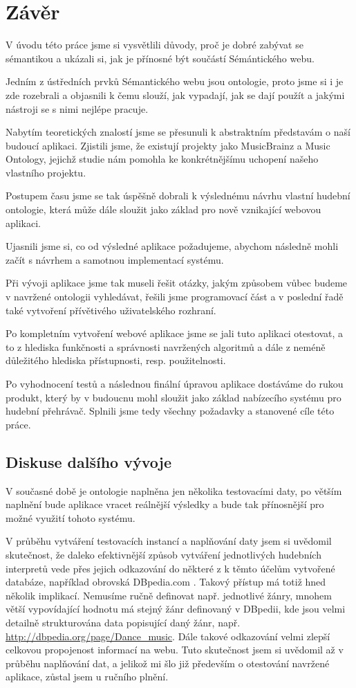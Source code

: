 \chapter{Závěr}

V úvodu této práce jsme si vysvětlili důvody, proč je dobré zabývat se sémantikou a ukázali si, jak je přínosné být součástí Sémántického webu.

Jedním z ústředních prvků Sémantického webu jsou ontologie, proto jsme si i je zde rozebrali a objasnili k čemu slouží, jak vypadají, jak se dají použít a jakými nástroji se s nimi nejlépe pracuje. 

Nabytím teoretických znalostí jsme se přesunuli k abstraktním představám o naší budoucí aplikaci. 
Zjistili jsme, že existují projekty jako MusicBrainz a Music Ontology, jejichž studie nám pomohla ke konkrétnějšímu uchopení našeho vlastního projektu.

Postupem času jsme se tak úspěšně dobrali k výslednému návrhu vlastní hudební ontologie, která může dále sloužit jako základ pro nově vznikající webovou aplikaci. 

Ujasnili jsme si, co od výsledné aplikace požadujeme, abychom následně mohli začít s návrhem a samotnou implementací systému.

Při vývoji aplikace jsme tak museli řešit otázky, jakým způsobem vůbec budeme v navržené ontologii vyhledávat, řešili jsme programovací část a v poslední řadě také vytvoření přívětivého uživatelského rozhraní.

Po kompletním vytvoření webové aplikace jsme se jali tuto aplikaci otestovat, a to z hlediska funkčnosti a správnosti navržených algoritmů a dále z neméně důležitého hlediska přístupnosti, resp. použitelnosti.

Po vyhodnocení testů a následnou finální úpravou aplikace dostáváme do rukou produkt, který by v budoucnu mohl sloužit jako základ nabízecího systému pro hudební přehrávač. 
Splnili jsme tedy všechny požadavky a stanovené cíle této práce.


\section{Diskuse dalšího vývoje}

V současné době je ontologie naplněna jen několika testovacími daty, po větším naplnění bude aplikace vracet reálnější výsledky a bude tak přínosnější pro možné využití tohoto systému.

V průběhu vytváření testovacích instancí a naplňování daty jsem si uvědomil skutečnost, že daleko efektivnější způsob vytváření jednotlivých hudebních interpretů vede přes jejich odkazování do některé z k těmto účelům vytvořené databáze, například obrovská DBpedia.com \cite{dbpedia}.
Takový přístup má totiž hned několik implikací. Nemusíme ručně definovat např. jednotlivé žánry, mnohem větší vypovídající hodnotu má stejný žánr definovaný v DBpedii, kde jsou velmi detailně strukturována data popisující daný žánr, např. \url{http://dbpedia.org/page/Dance_music}. 	
Dále takové odkazování velmi zlepší celkovou propojenost informací na webu.
Tuto skutečnost jsem si uvědomil až v průběhu naplňování dat, a jelikož mi šlo již především o otestování navržené aplikace, zůstal jsem u ručního plnění. 

